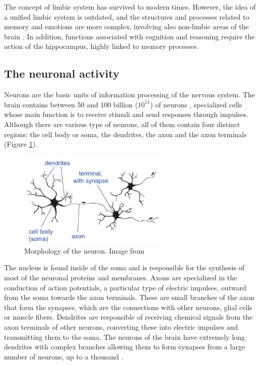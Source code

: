 The concept of limbic system has survived to modern times. However, the idea of a unified limbic system is outdated, and the structures and processes related to memory and emotions are more complex, involving also non-limbic areas of the brain \citep{Rolls2015}. In addition,  functions associated with cognition and reasoning require the action of the hippocampus, highly linked to memory processes.

\subsection{The neuronal activity}

Neurons are the basic units of information processing of the nervous system. The brain contains between 50 and 100 billion ($10^{11}$) of neurons \citep{Andreassi2007}, specialized cells whose main function is to receive stimuli and send responses through impulses. Although there are various type of neurons, all of them contain four distinct regions: the cell body or soma, the dendrites, the axon and the axon terminals (Figure \ref{fig:neuron}). 

\begin{figure}[ht]
\centering
\includegraphics[width=0.65\textwidth]{Images/Neuron.JPG}
\caption{Morphology of the neuron. Image from \citet{Carpenter2012}}
\label{fig:neuron}
\end{figure}


The nucleus is found inside of the soma and is responsible for the synthesis of most of the neuronal proteins and membranes. Axons are specialized in the conduction of action potentials, a particular type of electric impulses, outward from the soma towards the axon terminals. These are small branches of the axon that form the synapses, which are the connections with other neurons, glial cells or muscle fibers. Dendrites are responsible of receiving chemical signals from the axon terminals of other neurons, converting these into electric impulses and transmitting them to the soma. The neurons of the brain have extremely long dendrites with complex branches allowing them to form synapses from a large number of neurons, up to a thousand \citep{Lodish2000}. 


